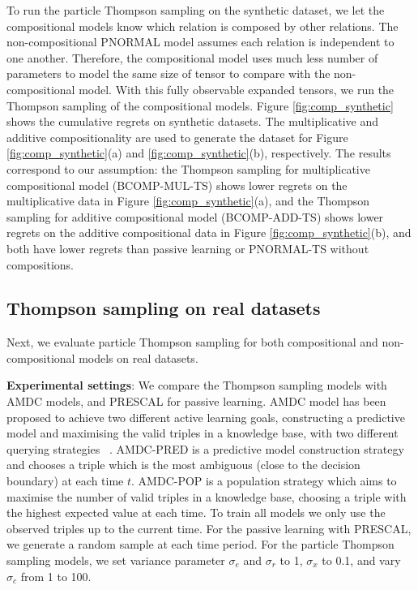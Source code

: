 To run the particle Thompson sampling on the synthetic dataset, we let the 
compositional models know which relation is composed by other relations. 
The non-compositional PNORMAL model assumes each relation is independent to one another. 
Therefore, the compositional model uses much less number of parameters to model 
the same size of tensor to compare with the non-compositional model. 
With this fully observable expanded tensors, we run the Thompson sampling of 
the compositional models.
Figure \ref{fig:comp_synthetic} shows the cumulative regrets on synthetic 
datasets. The multiplicative and additive compositionality are used to 
generate the dataset for Figure \ref{fig:comp_synthetic}(a) and 
\ref{fig:comp_synthetic}(b), respectively. The results correspond to our 
assumption: the Thompson sampling for multiplicative compositional model (BCOMP-MUL-TS) shows lower 
regrets on the multiplicative data in Figure \ref{fig:comp_synthetic}(a), and 
the Thompson sampling for additive compositional model (BCOMP-ADD-TS) shows lower regrets on the 
additive compositional data in Figure \ref{fig:comp_synthetic}(b), 
and both have lower regrets than passive learning or PNORMAL-TS without compositions. 

\subsection{Thompson sampling on real datasets}

Next, we evaluate particle Thompson sampling for both compositional and non-compositional models on real datasets.

\textbf{Experimental settings}: 
We compare the Thompson sampling models with AMDC models, and PRESCAL for passive learning.  
AMDC model has been proposed to achieve two different active learning goals, constructing a predictive
model and maximising the valid triples in a knowledge base, with two different querying strategies
~\cite{kajino2015active}. 
AMDC-PRED is a predictive model construction strategy and chooses a triple which is the most ambiguous (close to the decision boundary) at each time $t$.
AMDC-POP is a population strategy which aims to maximise the number of valid triples in a knowledge base, choosing a triple with the highest expected value at each time.  
To train all models we only use the observed triples up to the current time. 
For the passive learning with PRESCAL, we generate a random sample at each time period. 
For the particle Thompson sampling models, we set variance parameter $\sigma_e$ and $\sigma_r$ to 1, $\sigma_x$ to 0.1, and vary $\sigma_c$ from 1 to 100.


